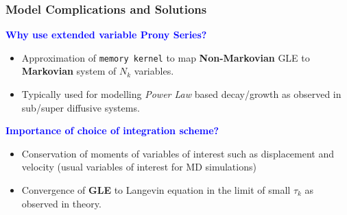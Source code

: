 \documentclass[a4paper,10pt]{beamer}
\begin{document}
	\begin{frame}
		\frametitle{Model Complications and Solutions}
		\small
		\textcolor{blue}{\textbf{Why use extended variable Prony Series?}}
		
		\begin{itemize}
			\item {Approximation of \texttt{memory kernel} to map {\textbf{Non-Markovian}} GLE to {\textbf{Markovian}} system of $N_{k}$ variables.}
			\item {Typically used for modelling \textit{Power Law} based decay/growth as observed in sub/super diffusive systems.}
		\end{itemize}
		
		\textcolor{blue}{\textbf{Importance of choice of integration scheme?}}
		
		\begin{itemize}
			\item {Conservation of moments of variables of interest such as displacement and velocity (usual variables of interest for MD simulations)}
			\item {Convergence of \textbf{GLE} to Langevin equation in the limit of small $\tau_{k}$ as observed in theory.}
		\end{itemize}
	\end{frame}
\end{document}

